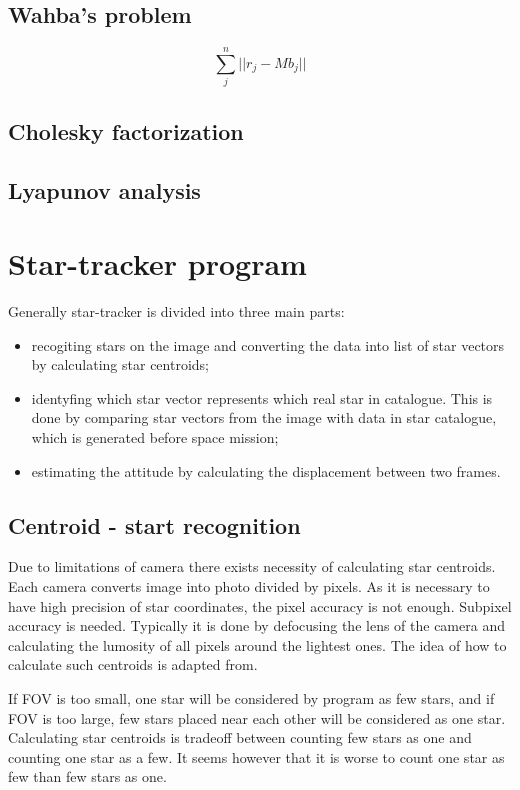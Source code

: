 \documentclass[12pt,a4paper,oneside]{article}
\begin{document}
\subsection{Wahba's problem}
\cite{wahba1965least}

\begin{equation}
\sum_j^n ||r_j - Mb_j||
\end{equation}
\subsection{Cholesky factorization}
\subsection{Lyapunov analysis}

\newpage
\section{Star-tracker program}
\cite{ju2003overview}\par
Generally star-tracker is divided into three main parts\cite{6187242}:
\begin{itemize}
\item recogiting stars on the image and converting the data into list of star vectors by calculating star centroids;
\item identyfing which star vector represents which real star in catalogue. This is done by comparing star vectors from the image with data in star catalogue, which is generated before space mission;
\item estimating the attitude by calculating the displacement between two frames.
\end{itemize}
\subsection{Centroid - start recognition}
\cite{samaan2002predictive}

Due to limitations of camera there exists necessity of calculating star centroids. Each camera converts image into photo divided by pixels. As it is necessary to have high precision of star coordinates, the pixel accuracy is not enough. Subpixel accuracy is needed. Typically it is done by defocusing the lens of the camera and calculating the lumosity of all pixels around the lightest ones. The idea of how to calculate such centroids is adapted from\cite{6187242}.

If FOV is too small, one star will be considered by program as few stars, and if FOV is too large, few stars placed near each other will be considered as one star. Calculating star centroids is tradeoff between counting few stars as one and counting one star as a few. It seems however that it is worse to count one star as few than few stars as one.
\end{document}
